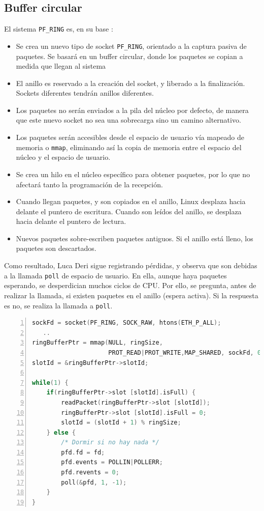 \subsection{Buffer circular}
El sistema \texttt{PF\_RING} es, en su base \cite{beyondDevicePolling}:

\begin{itemize}
  \item Se crea un nuevo tipo de socket \texttt{PF\_RING}, orientado a la captura pasiva de paquetes. Se basará 
en un buffer circular, donde los paquetes se copian a medida que llegan al sistema
  \item El anillo es reservado a la creación del socket, y liberado a la finalización. Sockets diferentes tendrán 
anillos diferentes.
  \item Los paquetes no serán enviados a la pila del núcleo por defecto, de manera que este nuevo socket no sea una 
sobrecarga sino un camino alternativo.
  \item Los paquetes serán accesibles desde el espacio de usuario vía mapeado de memoria o \texttt{mmap}, 
eliminando así la copia de memoria entre el espacio del núcleo y el espacio de usuario.
  \item Se crea un hilo en el núcleo específico para obtener paquetes, por lo que no afectará tanto la programación de 
la recepción.
  \item Cuando llegan paquetes, y son copiados en el anillo, Linux desplaza hacia delante el puntero de escritura. 
Cuando son leídos del anillo, se desplaza hacia delante el puntero de lectura.
  \item Nuevos paquetes sobre-escriben paquetes antiguos. Si el anillo está lleno, los paquetes son descartados.
\end{itemize}

Como resultado, Luca Deri sigue registrando pérdidas, y observa que son debidas a la llamada \texttt{poll} de espacio 
de usuario. En ella, aunque haya paquetes esperando, se desperdician muchos ciclos de CPU. Por ello, se pregunta, antes 
de realizar la llamada, si existen paquetes en el anillo (espera activa). Si la respuesta es no, se realiza la llamada 
a \texttt{poll}.

\begin{lstlisting}[language=C++,caption={Lectura de paquetes con poll en el núcleo}, 
breaklines=true, label=code:PFRINGKernelPoll,numbers=left,float=htbp]
sockFd = socket(PF_RING, SOCK_RAW, htons(ETH_P_ALL);
   ..
ringBufferPtr = mmap(NULL, ringSize,
                     PROT_READ|PROT_WRITE,MAP_SHARED, sockFd, 0);
slotId = &ringBufferPtr->slotId;

while(1) {
    if(ringBufferPtr->slot [slotId].isFull) {
        readPacket(ringBufferPtr->slot [slotId]);
        ringBufferPtr->slot [slotId].isFull = 0;
        slotId = (slotId + 1) % ringSize;
    } else {
        /* Dormir si no hay nada */
        pfd.fd = fd;
        pfd.events = POLLIN|POLLERR;
        pfd.revents = 0;
        poll(&pfd, 1, -1);
    }
}
\end{lstlisting}

